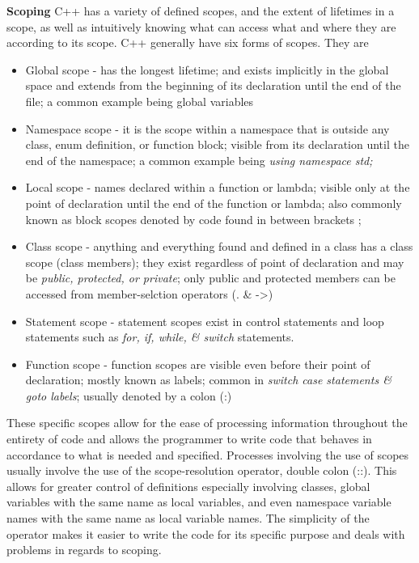 \documentclass[12pt]{article}
\begin{document}
\textbf{Scoping} C++ has a variety of defined scopes, and the extent of lifetimes in a scope, as well as intuitively knowing what can access what and where they are according to its scope. C++ generally have six forms of scopes. They are
\begin{itemize}
  \item Global scope - has the longest lifetime; and exists implicitly in the global space and extends from the beginning of its declaration until the end of the file; a common example being global variables
  \item Namespace scope - it is the scope within a namespace that is outside any class, enum definition, or function block; visible from its declaration until the end of the namespace; a common example being \textit{using namespace std;}
  \item Local scope - names declared within a function or lambda; visible only at the point of declaration until the end of the function or lambda; also commonly known as block scopes denoted by code found in between brackets {};
  \item Class scope - anything and everything found and defined in a class has a class scope (class members); they exist regardless of point of declaration and may be \textit{public, protected, or private}; only public and protected members can be accessed from member-selction operators (. \& -\textgreater)
  \item Statement scope - statement scopes exist in control statements and loop statements such as \textit{for, if, while, \& switch} statements.
  \item Function scope - function scopes are visible even before their point of declaration; mostly known as labels; common in \textit{switch case statements \& goto labels}; usually denoted by a colon (:)
\end{itemize}

These specific scopes allow for the ease of processing information throughout the entirety of code and allows the programmer to write code that behaves in accordance to what is needed and specified. Processes involving the use of scopes usually involve the use of the scope-resolution operator, double colon (::). This allows for greater control of definitions especially involving classes, global variables with the same name as local variables, and even namespace variable names with the same name as local variable names. The simplicity of the operator makes it easier to write the code for its specific purpose and deals with problems in regards to scoping. 
\end{document}
